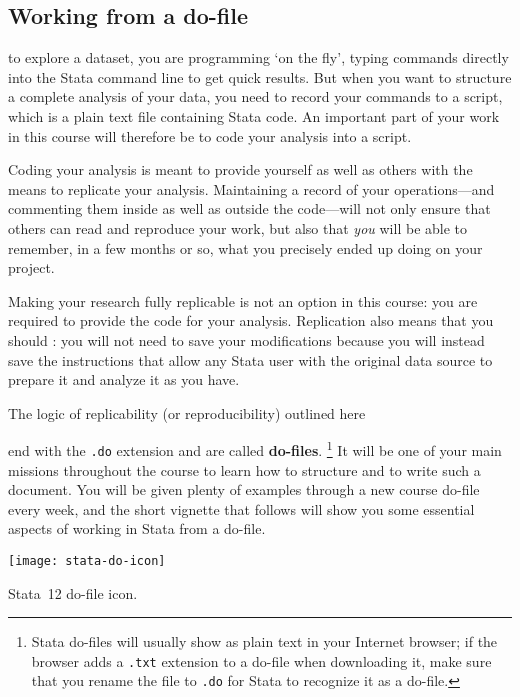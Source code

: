 	\subsection{Working from a do-file}%
		\label{sec:do-files}%

	 to explore a dataset, you are programming `on the fly', typing commands directly into the Stata command line to get quick results. But when you want to structure a complete analysis of your data, you need to record your commands to a script, which is a plain text file containing Stata code. An important part of your work in this course will therefore be to code your analysis into a script.%
	
	Coding your analysis is meant to provide yourself as well as others with the means to replicate your analysis. Maintaining a record of your operations—and commenting them inside as well as outside the code—will not only ensure that others can read and reproduce your work, but also that \emph{you} will be able to remember, in a few months or so, what you precisely ended up doing on your project.%
	
	Making your research fully replicable is not an option in this course: you are required to provide the code for your analysis. Replication also means that you should : you will not need to save your modifications because you will instead save the instructions that allow any Stata user with the original data source to prepare it and analyze it as you have.%
	
	The logic of replicability (or reproducibility) outlined here 
	
	 end with the \texttt{.do} extension and are called \textbf{do-files}.%
		 \footnote{Stata do-files will usually show as plain text in your Internet browser; if the browser adds a \texttt{.txt} extension to a do-file when downloading it, make sure that you rename the file to \texttt{.do} for Stata to recognize it as a do-file.} %
		It will be one of your main missions throughout the course to learn how to structure and to write such a document. You will be given plenty of examples through a new course do-file every week, and the short vignette that follows will show you some essential aspects of working in Stata from a do-file.%
		
		\begin{marginfigure}
			\texttt{[image: stata-do-icon]}
			\caption{Stata~12 do-file icon.}
			\label{fig:stata-do}
		\end{marginfigure}

